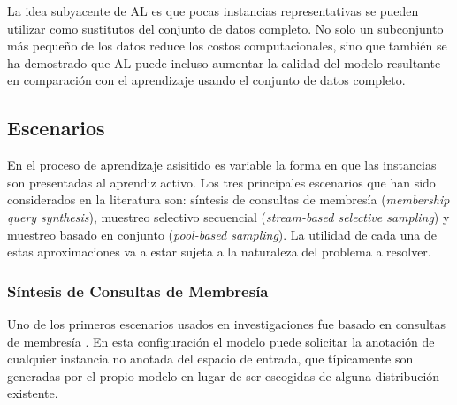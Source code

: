 La idea subyacente de AL es que pocas instancias representativas se pueden utilizar como sustitutos del conjunto de datos completo. No solo
un subconjunto más pequeño de los datos reduce los costos computacionales, sino que también se ha demostrado que AL puede incluso aumentar la calidad del modelo resultante en comparación con el aprendizaje usando el conjunto de datos completo. \cite{schohn2000less, figueroa2012active}

\subsection{Escenarios}

En el proceso de aprendizaje asisitido es variable la forma en que las instancias son presentadas al aprendiz activo. Los tres principales escenarios que han sido considerados en la literatura son: síntesis de consultas de membresía (\textit{membership query synthesis}), muestreo selectivo secuencial (\textit{stream-based selective sampling}) y muestreo basado en conjunto (\textit{pool-based sampling}). La utilidad de cada una de estas aproximaciones va a estar sujeta a la naturaleza del problema a resolver.

\subsubsection{Síntesis de Consultas de Membresía}


Uno de los primeros escenarios usados en investigaciones fue basado en consultas de membresía \cite{angluin1988queriesAC}. En esta configuración el modelo puede solicitar la anotación de cualquier instancia no anotada del espacio de entrada, que típicamente son generadas por el propio modelo en lugar de ser escogidas de alguna distribución existente. 



